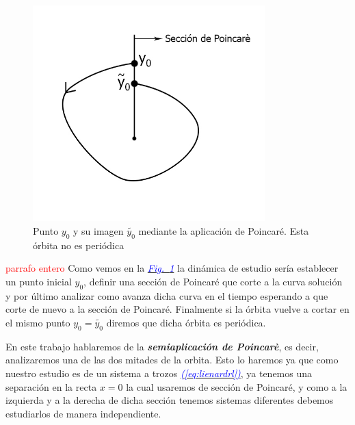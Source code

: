 \documentclass[12pt,a4paper]{report} %
\newcommand{\fref}[1]{\hyperref[#1]{\textcolor{blue}{\textit{Fig.~\ref*{#1}}}}}
\newcommand{\eref}[1]{\hyperref[#1]{\textcolor{blue}{\textit{(\ref*{#1})}}}}
\begin{document}
	\begin{figure}[h]
		\centering
		\includegraphics[width=0.8\textwidth]{aplipoincare2.jpg}
		\caption{Punto $y_0$ y su imagen $\tilde{y_0}$ mediante la aplicación de Poincaré. Esta órbita no es periódica}
		\label{fig:aplipoincare2}
	\end{figure}\smallskip
	\textcolor{red}{parrafo entero}
\noindent Como vemos en la \fref{fig:aplipoincare2} la dinámica de estudio sería establecer un punto inicial $y_0$, definir una sección de Poincaré que corte a la curva solución y por último analizar como avanza dicha curva en el tiempo esperando a que corte de nuevo a la sección de Poincaré. Finalmente si la órbita vuelve a cortar en el mismo punto $y_0=\tilde{y_0}$ diremos que dicha órbita es periódica.
	\newpage
	
	En este trabajo hablaremos de la \textit{\textbf{semiaplicación de Poincarè}}, es decir, analizaremos una de las dos mitades de la orbita. Esto lo haremos ya que como nuestro estudio es de un sistema a trozos \eref{eq:lienardrl}, ya tenemos una separación en la recta $x=0$ la cual usaremos de sección de Poincaré, y como a la izquierda y a la derecha de dicha sección tenemos sistemas diferentes debemos estudiarlos de manera independiente.
	
\end{document}
